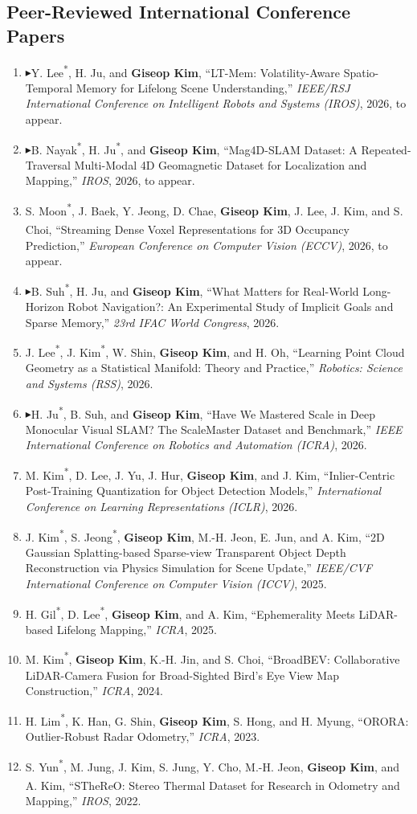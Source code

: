 \documentclass[10pt,a4paper]{article}
\newcommand{\pub}[1]{\item #1}
\newcommand{\leadpub}{\textbf{\ensuremath{\blacktriangleright}}\hspace{0.25em}}
\newcommand{\me}{\textbf{Giseop Kim}}
\newcommand{\corr}{\textsuperscript{\dag}}
\newcommand{\first}{\textsuperscript{*}}
\begin{document}
\subsection{Peer-Reviewed International Conference Papers}
\begin{enumerate}[resume]
\pub{\leadpub Y. Lee\first, H. Ju, and \me\corr, ``LT-Mem: Volatility-Aware Spatio-Temporal Memory for Lifelong Scene Understanding,'' \textit{IEEE/RSJ International Conference on Intelligent Robots and Systems (IROS)}, 2026, to appear.}
\pub{\leadpub B. Nayak\first, H. Ju\first, and \me\corr, ``Mag4D-SLAM Dataset: A Repeated-Traversal Multi-Modal 4D Geomagnetic Dataset for Localization and Mapping,'' \textit{IROS}, 2026, to appear.}
\pub{S. Moon\first, J. Baek, Y. Jeong, D. Chae, \me, J. Lee, J. Kim\corr, and S. Choi\corr, ``Streaming Dense Voxel Representations for 3D Occupancy Prediction,'' \textit{European Conference on Computer Vision (ECCV)}, 2026, to appear.}
\pub{\leadpub B. Suh\first, H. Ju, and \me\corr, ``What Matters for Real-World Long-Horizon Robot Navigation?: An Experimental Study of Implicit Goals and Sparse Memory,'' \textit{23rd IFAC World Congress}, 2026.}
\pub{J. Lee\first, J. Kim\first, W. Shin, \me, and H. Oh\corr, ``Learning Point Cloud Geometry as a Statistical Manifold: Theory and Practice,'' \textit{Robotics: Science and Systems (RSS)}, 2026.}
\pub{\leadpub H. Ju\first, B. Suh, and \me\corr, ``Have We Mastered Scale in Deep Monocular Visual SLAM? The ScaleMaster Dataset and Benchmark,'' \textit{IEEE International Conference on Robotics and Automation (ICRA)}, 2026.}
\pub{M. Kim\first, D. Lee, J. Yu, J. Hur, \me, and J. Kim\corr, ``Inlier-Centric Post-Training Quantization for Object Detection Models,'' \textit{International Conference on Learning Representations (ICLR)}, 2026.}
\pub{J. Kim\first, S. Jeong\first, \me, M.-H. Jeon, E. Jun, and A. Kim\corr, ``2D Gaussian Splatting-based Sparse-view Transparent Object Depth Reconstruction via Physics Simulation for Scene Update,'' \textit{IEEE/CVF International Conference on Computer Vision (ICCV)}, 2025.}
\pub{H. Gil\first, D. Lee\first, \me, and A. Kim\corr, ``Ephemerality Meets LiDAR-based Lifelong Mapping,'' \textit{ICRA}, 2025.}
\pub{M. Kim\first, \me, K.-H. Jin, and S. Choi\corr, ``BroadBEV: Collaborative LiDAR-Camera Fusion for Broad-Sighted Bird's Eye View Map Construction,'' \textit{ICRA}, 2024.}
\pub{H. Lim\first, K. Han, G. Shin, \me, S. Hong, and H. Myung\corr, ``ORORA: Outlier-Robust Radar Odometry,'' \textit{ICRA}, 2023.}
\pub{S. Yun\first, M. Jung, J. Kim, S. Jung, Y. Cho, M.-H. Jeon, \me, and A. Kim\corr, ``STheReO: Stereo Thermal Dataset for Research in Odometry and Mapping,'' \textit{IROS}, 2022.}

\end{enumerate}
\end{document}
